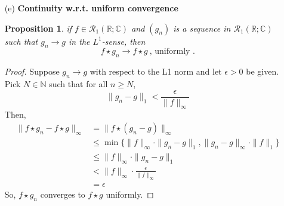 \documentclass[12pt, reqno]{amsart}
\newtheorem{prop}{Proposition}[section]
\theoremstyle{definition}
\theoremstyle{remark}
\begin{document}
\begin{itemize}
\begin{itemize}
\begin{proof}
   It suffices to show that $$\|f\star g\|_{\infty}\le\|g\|_{\infty}\cdot\|f\|_{1}$$Then, the symmetry property in part (a) gives \begin{align*}
      \|f\star g\|_{\infty}&= \|g\star f\|_\infty\le \|f\|_{\infty}\cdot\|g\|_{1}
      \end{align*}
      Proof: \begin{align*}
      \|f\star g\|_{\infty}&= \left\|\int_{0}^{1}f(s)g(t-s)\ ds\right\|_{\infty}\\
      &= \sup_{t\in\mathbb{R}} \left\{\left|\int_{0}^{1}f(s)g(t-s)\ ds\right|\right\}\\
      &\le \sup_{t\in \mathbb{R}}\left\{\int_{0}^{1}|f(s)|\cdot|g(t-s)|\ ds\right\}\\
      &\le \sup_{t\in \mathbb{R}}\left\{\|g\|_{\infty}\int_{0}^{1}|f(s)|\ ds\right\}\\
      &= \|g\|_{\infty}\int_{0}^{1}|f(s)|\ ds\\
      &= \|g\|_{\infty}\cdot\|f\|_{1}
      \end{align*}
\end{proof}

\vspace{0.1 cm}
\item[(e)] {\bf{Continuity w.r.t. uniform convergence}}
\begin{prop}
   
if $f \in \mathcal{R}_1(\mathbb{R}; \mathbb{C})$ and $(g_n)$ is a sequence in $\mathcal{R}_1(\mathbb{R}; \mathbb{C})$ such that $g_n \to g$ in the $L^1$-sense, then 
\begin{equation}
   f \star g_n \to f \star g ~\mbox{, uniformly .}
\end{equation}
\end{prop}

\begin{proof}
   Suppose $g_{n}\rightarrow g$ with respect to the L1 norm and let $\epsilon>0$ be given. Pick $N\in \mathbb{N}$ such that for all $n\ge N$, $$\|g_{n}-g\|_{1}< \frac{\epsilon}{\|f\|_{\infty}}$$Then, 
\begin{align*}
\|f\star g_{n}-f\star g\|_{\infty}&= \|f\star(g_{n}-g)\|_{\infty}\\
&\le \min\{\|f\|_{\infty}\cdot \|g_{n}-g\|_{1}, \|g_{n}-g\|_{\infty}\cdot\|f\|_{1}\}\\
&\le \|f\|_{\infty}\cdot \|g_{n}-g\|_{1}\\
&< \|f\|_{\infty}\cdot \frac{\epsilon}{\|f\|_{\infty}}\\
&= \epsilon
\end{align*}So, $f\star g_{n}$ converges to $f\star g$ uniformly.
\end{proof}


\end{itemize}
\end{itemize}
\end{document}
